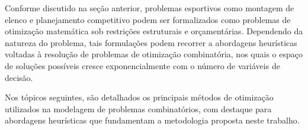 Conforme discutido na seção anterior, problemas esportivos como montagem de elenco e planejamento competitivo 
podem ser formalizados como problemas de otimização matemática sob restrições estruturais e orçamentárias. 
Dependendo da natureza do problema, tais formulações podem recorrer a abordagens heurísticas voltadas à resolução 
de problemas de otimização combinatória, nos quais o espaço de soluções possíveis cresce exponencialmente com o número de variáveis de decisão.

Nos tópicos seguintes, são detalhados os principais métodos de otimização utilizados na modelagem de problemas combinatórios, com destaque para abordagens heurísticas 
que fundamentam a metodologia proposta neste trabalho.

